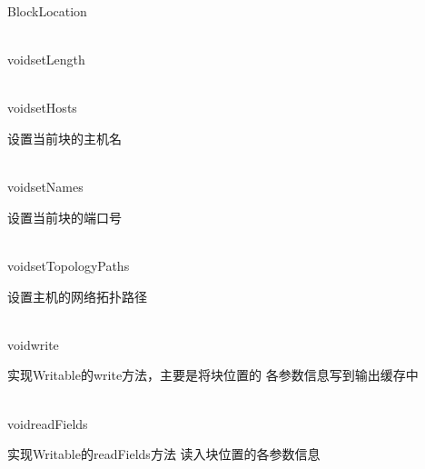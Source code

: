\begin{XeClass}{BlockLocation}
\begin{XeMethod}{\XePublic\\ }{void}{setLength}
  \end{XeMethod}

  \begin{XeMethod}{\XePublic\\ }{void}{setHosts}
       
 设置当前块的主机名

  \end{XeMethod}

  \begin{XeMethod}{\XePublic\\ }{void}{setNames}
       
 设置当前块的端口号

  \end{XeMethod}

  \begin{XeMethod}{\XePublic\\ }{void}{setTopologyPaths}
       
 设置主机的网络拓扑路径

  \end{XeMethod}

  \begin{XeMethod}{\XePublic\\ }{void}{write}
       
 实现Writable的write方法，主要是将块位置的
 各参数信息写到输出缓存中

  \end{XeMethod}

  \begin{XeMethod}{\XePublic\\ }{void}{readFields}
       
 实现Writable的readFields方法
 读入块位置的各参数信息

  \end{XeMethod}

\end{XeClass}
